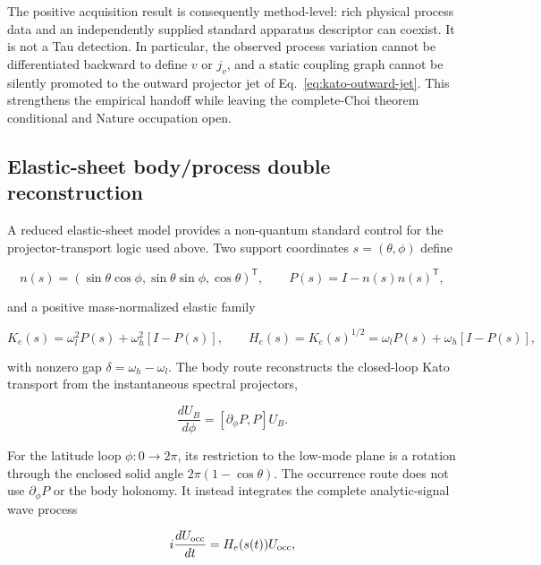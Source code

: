 \documentclass[11pt]{article}
\begin{document}
The positive acquisition result is consequently method-level: rich physical
process data and an independently supplied standard apparatus descriptor can
coexist. It is not a Tau detection. In particular, the observed process
variation cannot be differentiated backward to define $v$ or $j_v$, and a
static coupling graph cannot be silently promoted to the outward projector
jet of Eq.~\eqref{eq:kato-outward-jet}. This strengthens the empirical handoff
while leaving the complete-Choi theorem conditional and Nature occupation
open.

\subsection{Elastic-sheet body/process double reconstruction}

A reduced elastic-sheet model provides a non-quantum standard control for the
projector-transport logic used above.  Two support coordinates
\(s=(\theta,\phi)\) define

\begin{equation}
 n(s)=(\sin\theta\cos\phi,\sin\theta\sin\phi,\cos\theta)^{\mathsf T},
 \qquad P(s)=I-n(s)n(s)^{\mathsf T},
 \label{eq:elastic-sheet-projector}
\end{equation}

and a positive mass-normalized elastic family

\begin{equation}
 K_e(s)=\omega_l^2P(s)+\omega_h^2[I-P(s)],
 \qquad
 H_e(s)=K_e(s)^{1/2}=\omega_lP(s)+\omega_h[I-P(s)],
 \label{eq:elastic-sheet-operators}
\end{equation}

with nonzero gap \(\delta=\omega_h-\omega_l\).  The body route reconstructs
the closed-loop Kato transport from the instantaneous spectral projectors,

\begin{equation}
 \frac{dU_B}{d\phi}=[\partial_\phi P,P]U_B.
 \label{eq:elastic-sheet-body-route}
\end{equation}

For the latitude loop \(\phi:0\to2\pi\), its restriction to the low-mode
plane is a rotation through the enclosed solid angle
\(2\pi(1-\cos\theta)\).  The occurrence route does not use
\(\partial_\phi P\) or the body holonomy.  It instead integrates the complete
analytic-signal wave process

\begin{equation}
 i\frac{dU_{\rm occ}}{dt}=H_e(s(t))U_{\rm occ},
 \label{eq:elastic-sheet-occurrence-route}
\end{equation}
\end{document}
